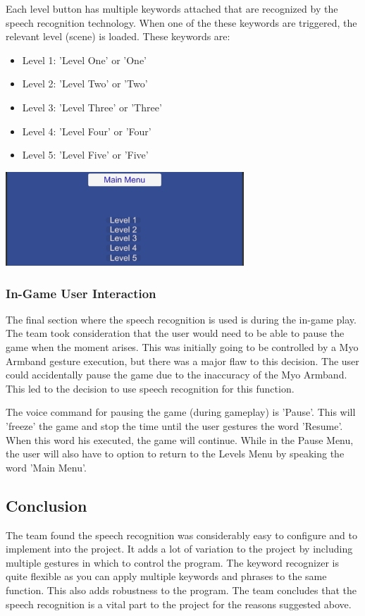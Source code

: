 \documentclass{article}
\begin{document}
Each level button has multiple keywords attached that are recognized by the speech recognition technology. When one of the these keywords are triggered, the relevant level (scene) is loaded. These keywords are:
\begin{itemize}
  \item Level 1: 'Level One' or 'One'
  \item Level 2: 'Level Two' or 'Two'
  \item Level 3: 'Level Three' or 'Three'
  \item Level 4: 'Level Four' or 'Four'
  \item Level 5: 'Level Five' or 'Five'
\end{itemize}
\includegraphics[height=100pt]{img/levelsMenu.PNG}


\subsubsection{In-Game User Interaction}
The final section where the speech recognition is used is during the in-game play. The team took consideration that the user would need to be able to pause the game when the moment arises. This was initially going to be controlled by a Myo Armband gesture execution, but there was a major flaw to this decision. The user could accidentally pause the game due to the inaccuracy of the Myo Armband. This led to the decision to use speech recognition for this function.

\bigskip

The voice command for pausing the game (during gameplay) is 'Pause'. This will 'freeze' the game and stop the time until the user gestures the word 'Resume'. When this word his executed, the game will continue. While in the Pause Menu, the user will also have to option to return to the Levels Menu by speaking the word 'Main Menu'.

\subsection{Conclusion}
The team found the speech recognition was considerably easy to configure and to implement into the project. It adds a lot of variation to the project by including multiple gestures in which to control the program. The keyword recognizer is quite flexible as you can apply multiple keywords and phrases to the same function. This also adds robustness to the program. The team concludes that the speech recognition is a vital part to the project for the reasons suggested above.
\end{document}
